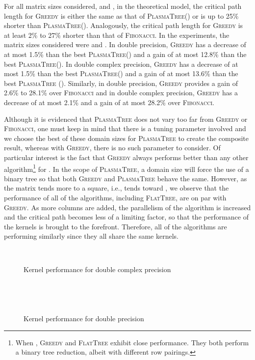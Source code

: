 \documentclass[a4paper,twopages]{article}
\newcommand{\MC}{\textsc{Fibonacci}\xspace}
\newcommand{\Greedy}{\textsc{Greedy}\xspace}
\newcommand{\FT}{\textsc{FlatTree}\xspace}
\newcommand{\PT}{\textsc{PlasmaTree}\xspace}
\begin{document}
For all matrix sizes considered,  and , in the
theoretical model, the critical path length for \Greedy is either the same as
that of \PT () or is up to 25\% shorter than \PT ().  Analogously, the
critical path length for \Greedy is at least 2\% to 27\% shorter than that of
\MC.  In the experiments, the matrix sizes considered were  and .  In double precision, \Greedy has a decrease of at
most 1.5\% than the best \PT () and a gain of at most 12.8\% than the best
\PT ().  In double complex precision, \Greedy has a decrease of at most
1.5\% than the best \PT () and a gain of at most 13.6\% than the best \PT
().  Similarly, in double precision, \Greedy provides a gain of 2.6\% to
28.1\% over \MC and in double complex precision, \Greedy has a decrease of at
most 2.1\% and a gain of at most 28.2\% over \MC.

Although it is evidenced that \PT does not vary too far from \Greedy or \MC,
one must keep in mind that there is a tuning parameter involved and we choose
the best of these domain sizes for \PT to create the composite result, whereas
with \Greedy, there is no such parameter to consider.  Of particular interest
is the fact that \Greedy always performs better than any other algorithm\footnote{When , \Greedy and \FT exhibit close performance. They
both perform a binary tree reduction, albeit with different row pairings.} for . In
the scope of \PT, a domain size  will force the use of a binary tree so
that both \Greedy and \PT behave the same. However, as the matrix tends more to
a square, i.e.,  tends toward , we observe that the performance of all of
the algorithms, including \FT, are on par with \Greedy.  As more columns are
added, the parallelism of the algorithm is increased and the critical path
becomes less of a limiting factor, so that the performance of the kernels is
brought to the forefront.  Therefore, all of the algorithms are performing
similarly since they all share the same kernels.

\begin{sidewaysfigure*}
\centering
\begin{minipage}{0.48\linewidth}
\\
    \caption{\label{fig.perf_kernels_z} Kernel performance for double complex precision}
\end{minipage}
~~
\begin{minipage}{0.48\linewidth}
\\
    \caption{\label{fig.perf_kernels_d} Kernel performance for double precision}
\end{minipage}
\end{sidewaysfigure*}
\end{document}
